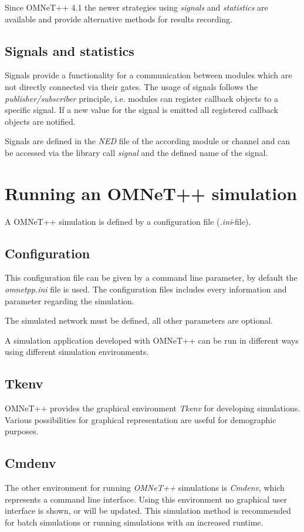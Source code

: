 Since OMNeT++ 4.1 the newer strategies using \emph{signals} and \emph{statistics} are available and provide alternative methods for results recording.

\subsection{Signals and statistics}
\label{sec:omnet_results_signals}
Signals provide a functionality for a communication between modules which are not directly connected via their gates.
The usage of signals follows the \emph{publisher/subscriber} principle, i.e. modules can register callback objects to a specific signal.
If a new value for the signal is emitted all registered callback objects are notified.

Signals are defined in the \emph{NED} file of the according module or channel and can be accessed via the library call \emph{signal} and the defined name of the signal.



\section{Running an OMNeT++ simulation}
\label{sec:omnet_running}
A OMNeT++ simulation is defined by a configuration file (\emph{.ini}-file).

\subsection{Configuration}
\label{sec:omnet_running_config}
This configuration file can be given by a command line parameter, by default the \emph{omnetpp.ini} file is used.
The configuration files includes every information and parameter regarding the simulation.

The simulated network must be defined, all other parameters are optional.



A simulation application developed with OMNeT++ can be run in different ways using different simulation environments.

\subsection{Tkenv}
\label{sec:omnet_running_tkenv}
OMNeT++ provides the graphical environment \emph{Tkenv} for developing simulations.
Various possibilities for graphical representation are useful for demographic purposes.


\subsection{Cmdenv}
\label{sec:omnet_running_cmdenv}
The other environment for running \emph{OMNeT++} simulations is \emph{Cmdenv}, which represents a command line interface.
Using this environment no graphical user interface is shown, or will be updated.
This simulation method is recommended for batch simulations or running simulations with an increased runtime.